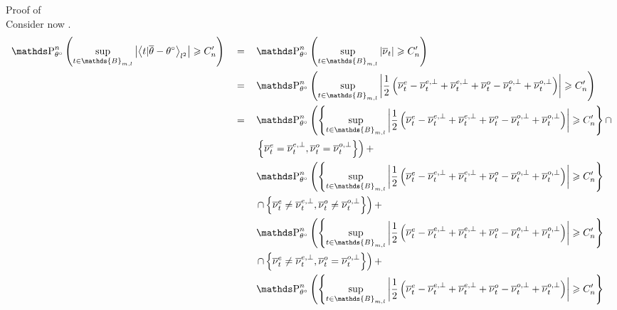 \begin{pro}{Proof of \\}
Consider now .
\begin{alignat*}{3}
& \P_{\theta^{\circ}}^{n}\left(\sup\limits_{t \in \mathds{B}_{m, l}} \left\vert \left\langle t \vert \overline{\theta} - \theta^{\circ}\right\rangle_{l^{2}} \right\vert \geq C_{n}'\right) && = && \P_{\theta^{\circ}}^{n}\left(\sup\limits_{t \in \mathds{B}_{m, l}} \left\vert \overline{\nu}_{t} \right\vert \geq C_{n}'\right)\notag\\
& && = && \P_{\theta^{\circ}}^{n}\left(\sup\limits_{t \in \mathds{B}_{m, l}} \left\vert \frac{1}{2} \left(\overline{\nu}_{t}^{e} - \overline{\nu}_{t}^{e, \perp} + \overline{\nu}_{t}^{e, \perp} + \overline{\nu}_{t}^{o} - \overline{\nu}_{t}^{o, \perp} + \overline{\nu}_{t}^{o, \perp}\right) \right\vert \geq C_{n}'\right)\notag\\
& && = && \P_{\theta^{\circ}}^{n}\left(\left\{\sup\limits_{t \in \mathds{B}_{m, l}} \left\vert \frac{1}{2} \left(\overline{\nu}_{t}^{e} - \overline{\nu}_{t}^{e, \perp} + \overline{\nu}_{t}^{e, \perp} + \overline{\nu}_{t}^{o} - \overline{\nu}_{t}^{o, \perp} + \overline{\nu}_{t}^{o, \perp} \right) \right\vert \geq C_{n}'\right\} \cap \right.\notag\\
& && && \left.\left\{ \overline{\nu}_{t}^{e} = \overline{\nu}_{t}^{e, \perp}, \overline{\nu}_{t}^{o} = \overline{\nu}_{t}^{o, \perp} \right\}\right) + \notag\\
& && && \P_{\theta^{\circ}}^{n}\left(\left\{\sup\limits_{t \in \mathds{B}_{m, l}} \left\vert \frac{1}{2} \left(\overline{\nu}_{t}^{e} - \overline{\nu}_{t}^{e, \perp} + \overline{\nu}_{t}^{e, \perp} + \overline{\nu}_{t}^{o} - \overline{\nu}_{t}^{o, \perp} + \overline{\nu}_{t}^{o, \perp}\right) \right\vert \geq C_{n}'\right\} \right.\notag\\
& && && \left.\cap \left\{ \overline{\nu}_{t}^{e} \neq \overline{\nu}_{t}^{e, \perp}, \overline{\nu}_{t}^{o} \neq \overline{\nu}_{t}^{o, \perp} \right\}\right) +\notag\\
& && && \P_{\theta^{\circ}}^{n}\left(\left\{\sup\limits_{t \in \mathds{B}_{m, l}} \left\vert \frac{1}{2} \left(\overline{\nu}_{t}^{e} - \overline{\nu}_{t}^{e, \perp} + \overline{\nu}_{t}^{e, \perp} + \overline{\nu}_{t}^{o} - \overline{\nu}_{t}^{o, \perp} + \overline{\nu}_{t}^{o, \perp}\right) \right\vert \geq C_{n}'\right\} \right.\notag\\
& && && \left.\cap \left\{ \overline{\nu}_{t}^{e} \neq \overline{\nu}_{t}^{e, \perp}, \overline{\nu}_{t}^{o} = \overline{\nu}_{t}^{o, \perp} \right\}\right) +\notag\\
& && && \P_{\theta^{\circ}}^{n}\left(\left\{\sup\limits_{t \in \mathds{B}_{m, l}} \left\vert \frac{1}{2} \left(\overline{\nu}_{t}^{e} - \overline{\nu}_{t}^{e, \perp} + \overline{\nu}_{t}^{e, \perp} + \overline{\nu}_{t}^{o} - \overline{\nu}_{t}^{o, \perp} + \overline{\nu}_{t}^{o, \perp}\right) \right\vert \geq C_{n}'\right\} \right.\notag\\

\end{alignat*}
\end{pro}

